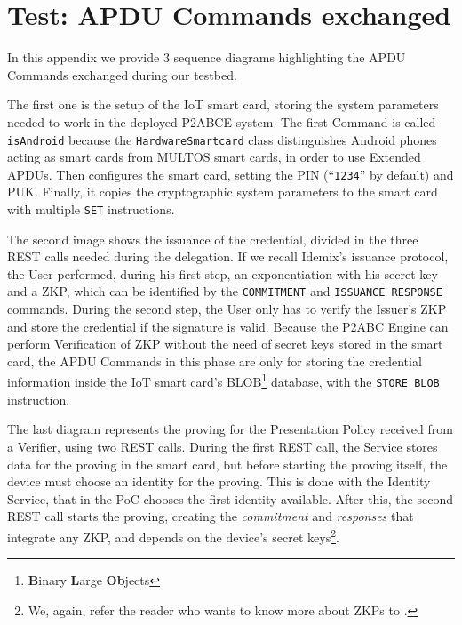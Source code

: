 


\chapter{Test: APDU Commands exchanged}\label{ch:resultsdiagrams}


In this appendix we provide 3 sequence diagrams highlighting the APDU Commands exchanged during our testbed. 


The first one is the setup of the IoT smart card, storing the system parameters needed to work in the deployed P2ABCE system. The first Command is called \texttt{isAndroid} because the \texttt{HardwareSmartcard} class distinguishes Android phones acting as smart cards from MULTOS smart cards, in order to use Extended APDUs. Then configures the smart card, setting the PIN (``\texttt{1234}'' by default) and PUK. Finally, it copies the cryptographic system parameters to the smart card with multiple \texttt{SET} instructions.

The second image shows the issuance of the credential, divided in the three REST calls needed during the delegation. If we recall Idemix's issuance protocol, the User performed, during his first step, an exponentiation with his secret key and a ZKP, which can be identified by the \texttt{COMMITMENT} and \texttt{ISSUANCE RESPONSE} commands. During the second step, the User only has to verify the Issuer's ZKP and store the credential if the signature is valid. Because the P2ABC Engine can perform Verification of ZKP without the need of secret keys stored in the smart card, the APDU Commands in this phase are only for storing the credential information inside the IoT smart card's BLOB\footnote{\textbf{B}inary \textbf{L}arge \textbf{Ob}jects} database, with the \texttt{STORE BLOB} instruction. 


The last diagram represents the proving for the Presentation Policy received from a Verifier, using two REST calls. During the first REST call, the Service stores data for the proving in the smart card, but before starting the proving itself, the device must choose an identity for the proving. This is done with the Identity Service, that in the PoC chooses the first identity available. After this, the second REST call starts the proving, creating the \textit{commitment} and \textit{responses} that integrate any ZKP, and depends on the device's secret keys\footnote{We, again, refer the reader who wants to know more about ZKPs to \citep{tfgmates}.}.


